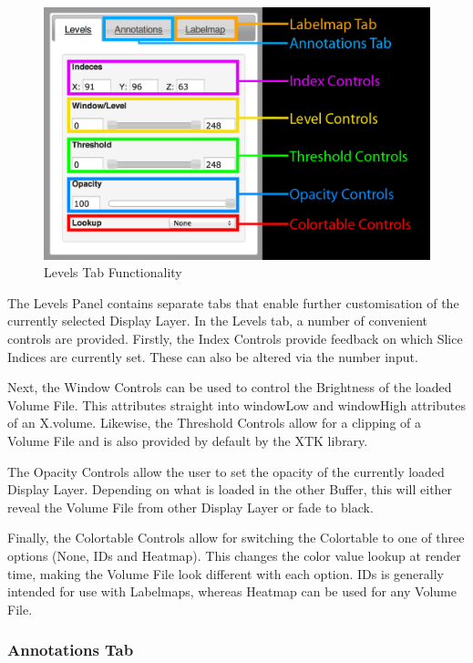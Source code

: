 \documentclass[a4paper,11pt,titlepage]{article}
\begin{document}
\begin{figure}[ht!]
\centering
\includegraphics[width=140mm]{graphics/features_04.png}
\caption{Levels Tab Functionality}
\label{fig:UIdesign1}
\end{figure}

The Levels Panel contains separate tabs that enable further customisation of the currently selected Display Layer. In the Levels tab, a number of convenient controls are provided. Firstly, the Index Controls provide feedback on which Slice Indices are currently set. These can also be altered via the number input. 

Next, the Window Controls can be used to control the Brightness of the loaded Volume File. This attributes straight into windowLow and windowHigh attributes of an X.volume. Likewise, the Threshold Controls allow for a clipping of a Volume File and is also provided by default by the XTK library.

The Opacity Controls allow the user to set the opacity of the currently loaded Display Layer. Depending on what is loaded in the other Buffer, this will either reveal the Volume File from other Display Layer or fade to black.

Finally, the Colortable Controls allow for switching the Colortable to one of three options (None, IDs and Heatmap). This changes the color value lookup at render time, making the Volume File look different with each option. IDs is generally intended for use with Labelmaps, whereas Heatmap can be used for any Volume File.



\subsubsection{Annotations Tab}
\end{document}
